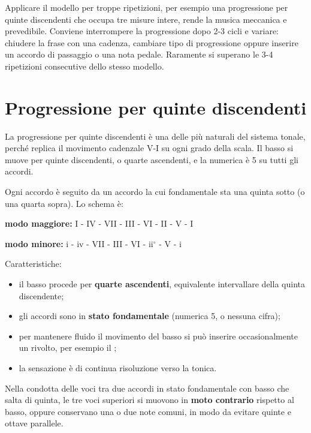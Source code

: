 \begin{errore}
	\label{err:progressioni_lunghe}
	Applicare il modello per troppe ripetizioni, per esempio una progressione per quinte discendenti che occupa tre misure intere, rende la musica meccanica e prevedibile. Conviene interrompere la progressione dopo 2-3 cicli e variare: chiudere la frase con una cadenza, cambiare tipo di progressione oppure inserire un accordo di passaggio o una nota pedale. Raramente si superano le 3-4 ripetizioni consecutive dello stesso modello.
\end{errore}

\section{Progressione per quinte discendenti}
\label{subsec:progressione_quinte}

La progressione per quinte discendenti è una delle più naturali del sistema tonale, perché replica il movimento cadenzale V-I su ogni grado della scala. Il basso si muove per quinte discendenti, o quarte ascendenti, e la numerica è 5 su tutti gli accordi.

\begin{regola}
	\label{reg:progressione_quinte_disc}
	Ogni accordo è seguito da un accordo la cui fondamentale sta una quinta sotto (o una quarta sopra). Lo schema è:

	\textbf{modo maggiore:} I - IV - VII - III - VI - II - V - I

	\textbf{modo minore:} i - iv - VII - III - VI - ii$^\circ$ - V - i

	Caratteristiche:
	\begin{itemize}
		\item il basso procede per \textbf{quarte ascendenti}, equivalente intervallare della quinta discendente;
		\item gli accordi sono in \textbf{stato fondamentale} (numerica 5, o nessuna cifra);
		\item per mantenere fluido il movimento del basso si può inserire occasionalmente un rivolto, per esempio il ;
		\item la sensazione è di continua risoluzione verso la tonica.
	\end{itemize}
\end{regola}

Nella condotta delle voci tra due accordi in stato fondamentale con basso che salta di quinta, le tre voci superiori si muovono in \textbf{moto contrario} rispetto al basso, oppure conservano una o due note comuni, in modo da evitare quinte e ottave parallele.

